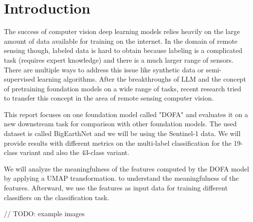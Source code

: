\section{Introduction}
\label{sec:intro}

The success of computer vision deep learning models relies heavily on the large amount of data available for training on the internet. \cite{Authors14} %
In the domain of remote sensing though, labeled data is hard to obtain because labeling is a complicated task (requires expert knowledge) and there is a much larger range of sensors. %
There are multiple ways to address this issue like synthetic data or semi-supervised learning algorithms. After the breakthroughs of LLM and the concept of pretraining foundation models on a wide range of tasks, recent research tried to transfer this concept in the area of remote sensing computer vision. %

This report focuses on one foundation model called "DOFA" %
and evaluates it on a new downstream task for comparison with other foundation models. The used dataset is called BigEarthNet %
and we will be using the Sentinel-1 data. We will provide results with different metrics on the multi-label classification for the 19-class variant and also the 43-class variant.

We will analyze the meaningfulness of the features computed by the DOFA model by applying a UMAP transformation. %
to understand the meaningfulness of the features. Afterward, we use the features as input data for training different classifiers on the classification task.

// TODO: example images